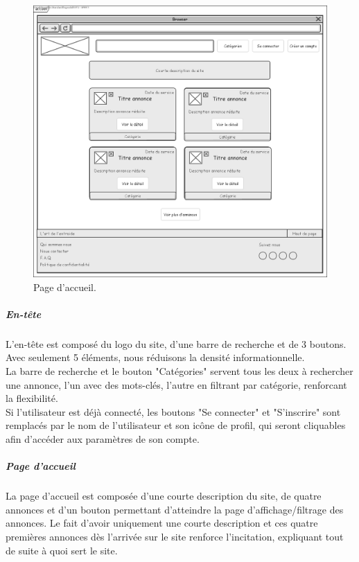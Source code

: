 \documentclass[a4paper,11pt]{article}
\begin{document}
\begin{figure}[H]
  \includegraphics[width=\linewidth]{images/maquette-accueil.png}
  \caption{Page d'accueil.}
  \label{fig:maquette-accueil}
\end{figure}

\pagebreak

\subparagraph{En-tête}

L'en-tête est composé du logo du site, d'une barre de recherche et de 3 boutons.
Avec seulement 5 éléments, nous réduisons la densité informationnelle.\\
La barre de recherche et le bouton "Catégories" servent tous les deux à rechercher une
annonce, l'un avec des mots-clés, l'autre en filtrant par catégorie, renforcant
la flexibilité.\\


Si l'utilisateur est déjà connecté, les boutons "Se connecter" et "S'inscrire"
sont remplacés par le nom de l'utilisateur et son icône de profil, qui seront
cliquables afin d'accéder aux paramètres de son compte.\\

\subparagraph{Page d'accueil}

La page d'accueil est composée d'une courte description du site, de quatre annonces et
d'un bouton permettant d'atteindre la page d'affichage/filtrage des annonces.
Le fait d'avoir uniquement une courte description et ces quatre premières annonces
dès l'arrivée sur le site renforce l'incitation, expliquant tout de suite à quoi sert
le site.\\
\end{document}
